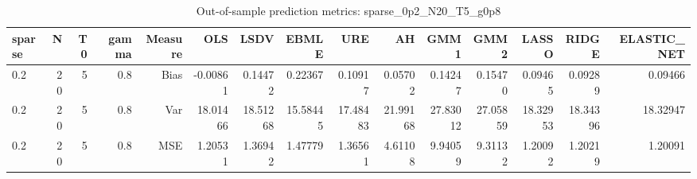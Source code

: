 \begin{table}[!htbp]\centering
\caption{Out-of-sample prediction metrics: sparse_0p2_N20_T5_g0p8}
\label{tab:table3_sparse_0p2_N20_T5_g0p8}
\begin{tabular}{lrrrrrrrrrrrrrr}
\hline
sparse & N & T0 & gamma & Measure & OLS & LSDV & EBMLE & URE & AH & GMM1 & GMM2 & LASSO & RIDGE & ELASTIC_NET \\
\hline
0.2 & 20 & 5 & 0.8 & Bias & -0.00861 & 0.14472 & 0.22367 & 0.10917 & 0.05702 & 0.14247 & 0.15470 & 0.09465 & 0.09289 & 0.09466 \\
0.2 & 20 & 5 & 0.8 & Var & 18.01466 & 18.51268 & 15.58445 & 17.48483 & 21.99168 & 27.83012 & 27.05859 & 18.32953 & 18.34396 & 18.32947 \\
0.2 & 20 & 5 & 0.8 & MSE & 1.20531 & 1.36942 & 1.47779 & 1.36561 & 4.61108 & 9.94059 & 9.31132 & 1.20092 & 1.20219 & 1.20091 \\
\hline
\end{tabular}
\end{table}

